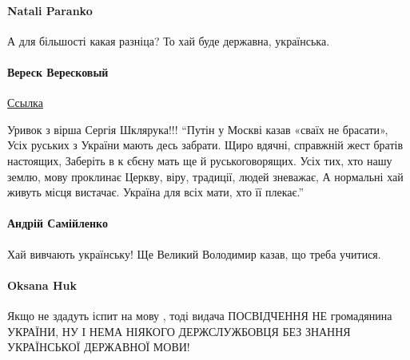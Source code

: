 \paragraph{Natali Paranko}
А для більшості какая разніца? То хай буде державна, українська.

\paragraph{Вереск Вересковый}
\href{https://www.facebook.com/profile.php?id=100026095720110&comment_id=Y29tbWVudDozNTY1Mjg1OTQwMTc1ODQ5XzM1NjU2NzQ4MzM0NzAyOTM%3D&__cft__[0]=AZXh9Wpmphhexq5-lKXWN0nHntp5tFgLubIoq71v8DN7O2Tmj2sC3toi8qyiSdjseCvI5FIi00eDafvumw_YkeZ3SEGgaWWYQxZFQhDzg8hI1GyLB7FyeHFoHtP0uThOVcI&__tn__=R]-R}{Ссылка}


Уривок з вірша Сергія Шклярука!!! \enquote{Путін у Москві казав «сваїх не брасати»,
Усіх руських з України мають десь забрати.
Щиро вдячні, справжній жест братів настоящих,
Заберіть в к єбєну мать ще й руськоговорящих.
Усіх тих, хто нашу землю, мову проклинає
Церкву, віру, традиції, людей зневажає,
А нормальні хай живуть місця вистачає.
Україна для всіх мати, хто її плекає.} 

\paragraph{Андрій Самійленко}
Хай вивчають українську! Ще Великий Володимир казав, що треба учитися.

\paragraph{Oksana Huk}

Якщо не здадуть іспит на мову , тоді видача ПОСВІДЧЕННЯ НЕ громадянина УКРАЇНИ,
НУ І НЕМА НІЯКОГО ДЕРЖСЛУЖБОВЦЯ БЕЗ ЗНАННЯ УКРАЇНСЬКОЇ ДЕРЖАВНОЇ МОВИ!

